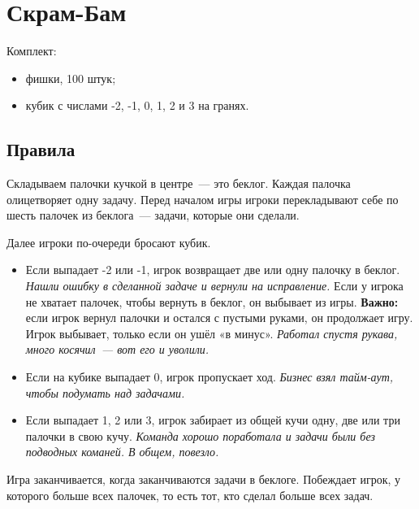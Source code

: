 



\thispagestyle{empty}

\section*{Скрам-Бам}

Комплект:

\begin{itemize}
    \item фишки, 100 штук;
    \item кубик с числами -2, -1, 0, 1, 2 и 3 на гранях.
\end{itemize}

\subsection*{Правила}

Складываем палочки кучкой в центре — это беклог.
Каждая палочка олицетворяет одну задачу.
Перед началом игры игроки перекладывают себе по шесть палочек из беклога — задачи, которые они сделали.

Далее игроки по-очереди бросают кубик.

\begin{itemize}
    \item Если выпадает -2 или -1, игрок возвращает две или одну палочку в беклог.
    \textit{Нашли ошибку в сделанной задаче и вернули на исправление.}
    Если у игрока не хватает палочек, чтобы вернуть в беклог, он выбывает из игры.
    \textbf{Важно:} если игрок вернул палочки и остался с пустыми руками, он продолжает игру.
    Игрок выбывает, только если он ушёл «в минус».
    \textit{Работал спустя рукава, много косячил — вот его и уволили.}

    \item Если на кубике выпадает 0, игрок пропускает ход.
    \textit{Бизнес взял тайм-аут, чтобы подумать над задачами.}

    \item Если выпадает 1, 2 или 3, игрок забирает из общей кучи одну, две или три палочки в свою кучу.
    \textit{Команда хорошо поработала и задачи были без подводных команей. В общем, повезло.}
\end{itemize}

Игра заканчивается, когда заканчиваются задачи в беклоге.
Побеждает игрок, у которого больше всех палочек, то есть тот, кто сделал больше всех задач.

